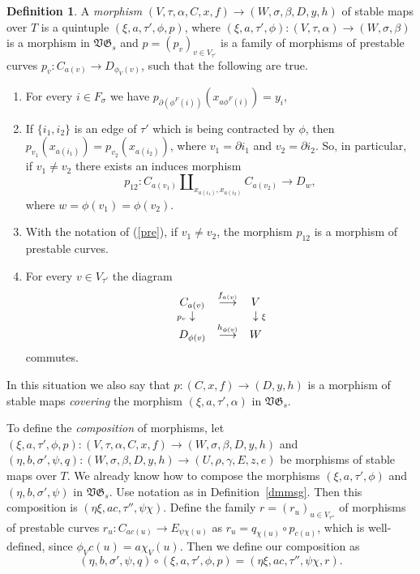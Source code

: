 \documentclass[11pt]{amsart}
\theoremstyle{definition}
\newtheorem{defn}[prop]{Definition}
\theoremstyle{remark}
\newcommand{\GG}{{\mathfrak{G}}}
\newcommand{\VV}{{\mathfrak{V}}}
\newcommand{\del}{\partial}
\newcommand{\comp}{\mathbin{{\scriptstyle\circ}}}
\newcommand{\ldiag}[1]
       {\makebox[0cm]{\({\scriptstyle#1}\downarrow\phantom{\scriptstyle#1}\)}}
\newcommand{\rdiag}[1]
       {\makebox[0cm]{\(\phantom{\scriptstyle#1}\downarrow{\scriptstyle#1}\)}}
\newcommand{\comdia}[9]{
\begin{array}{ccc}
#1 & \stackrel{#2}{\longrightarrow} & #3 \\
\ldiag{#4} & #5 & \rdiag{#6} \\
#7 & \stackrel{#8}{\longrightarrow} & #9
\end{array}}
\newcommand{\s}{_{\sigma}}
\theoremstyle{plain}
\theoremstyle{definition}
\theoremstyle{remark}
\begin{document}
\begin{defn}
A {\em morphism }\((V,\tau,\alpha,C,x,f)\rightarrow (W,\sigma,\beta,D,y,h)\) of
stable maps over \(T\) is a quintuple
\((\xi,a,\tau',\phi,p)\), where \((\xi,a,\tau',\phi):(V,\tau,\alpha)\rightarrow
(W,\sigma,\beta)\) is a morphism in
\(\VV\GG_s\) and \(p=(p_v)_{v\in V_{\tau'}}\) is a family of morphisms of prestable
curves \(p_v:C_{a(v)}\rightarrow
D_{\phi_V(v)}\), such that the following are true.
\begin{enumerate}
\item \label{mpc1}For every \(i\in F\s\) we have
\(p_{\del(\phi^F(i))}(x_{a\phi^F(i)})=y_i\),
\item \label{pre} If \(\{i_1,i_2\}\) is an edge of \(\tau'\) which is being
contracted by \(\phi\), then
\(p_{v_1}(x_{a(i_1)})=p_{v_2}(x_{a(i_2)})\), where \(v_1=\del i_1\) and \(v_2=\del
i_2\). So, in particular, if \(v_1\not=v_2\)
there exists an induces morphism
\[
p_{12}:C_{a(v_1)}\amalg_{x_{a(i_1)},x_{a(i_2)}}C_{a(v_2)}\rightarrow D_w,
\]
where \(w=\phi(v_1)=\phi(v_2)\).
\item \label{post} With the notation of (\ref{pre}), if \(v_1\not=v_2\), the
morphism \(p_{12}\) is a morphism of prestable
curves.
\item For every \(v\in V_{\tau'}\) the diagram
\[
\comdia{C_{a(v)}}{f_{a(v)}}{V}{p_v}{}{\xi}{D_{\phi(v)}}{h_{\phi(v)}}{W}
\]
commutes.
\end{enumerate}
In this situation we also say that \(p:(C,x,f)\rightarrow(D,y,h)\) is a morphism
of stable maps {\em covering
}the morphism \((\xi,a,\tau',\alpha)\) in \(\VV\GG_s\).

To define the {\em composition } of morphisms, let
\((\xi,a,\tau',\phi,p):(V,\tau,\alpha,C,x,f)\rightarrow(W,\sigma,\beta,D,y,h)\)
and
\((\eta,b,\sigma',\psi,q):(W,\sigma,\beta,D,y,h)\rightarrow(U,\rho,
\gamma,E,z,e)\) be morphisms of stable maps over
\(T\). We already know how to compose the morphisms \((\xi,a,\tau',\phi)\) and
\((\eta,b,\sigma',\psi)\) in \(\VV\GG_s\). Use
notation as in Definition~\ref{dmmsg}. Then this composition is
\((\eta\xi,ac,\tau'',\psi\chi)\). Define the family
\(r=(r_u)_{u\in V_{\tau''}}\) of morphisms of prestable curves
\(r_u:C_{ac(u)}\rightarrow E_{\psi\chi(u)}\) as
\(r_u=q_{\chi(u)}\comp p_{c(u)}\), which is well-defined, since
\(\phi_Vc(u)=a\chi_V(u)\). Then we define our composition as
\[
(\eta,b,\sigma',\psi,q)\comp(\xi,a,\tau',\phi,p) =
(\eta\xi,ac,\tau'',\psi\chi,r).
\]
\end{defn}
\end{document}
